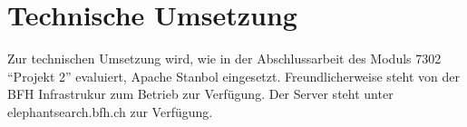 \chapter{Technische Umsetzung}
\label{chap:technischeUmsetzung}
Zur technischen Umsetzung wird, wie in der Abschlussarbeit des Moduls 7302 "`Projekt 2"' evaluiert, Apache Stanbol eingesetzt.
Freundlicherweise steht von der BFH Infrastrukur zum Betrieb zur Verfügung. Der Server steht unter elephantsearch.bfh.ch zur Verfügung.